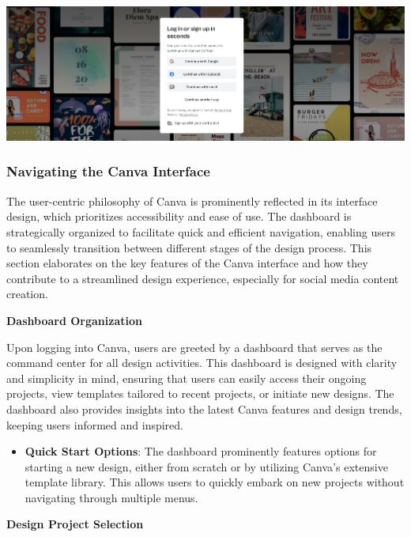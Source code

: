 \documentclass[
]{book}
\providecommand{\tightlist}{%
  \setlength{\itemsep}{0pt}\setlength{\parskip}{0pt}}
\begin{document}
\href{https://www.canva.com/login/}{\includegraphics[width=1\textwidth,height=\textheight]{images/clipboard-1368785933.png}}

\hypertarget{navigating-the-canva-interface}{%
\subsubsection*{Navigating the Canva Interface}\label{navigating-the-canva-interface}}

The user-centric philosophy of Canva is prominently reflected in its interface design, which prioritizes accessibility and ease of use. The dashboard is strategically organized to facilitate quick and efficient navigation, enabling users to seamlessly transition between different stages of the design process. This section elaborates on the key features of the Canva interface and how they contribute to a streamlined design experience, especially for social media content creation.

\textbf{Dashboard Organization}

Upon logging into Canva, users are greeted by a dashboard that serves as the command center for all design activities. This dashboard is designed with clarity and simplicity in mind, ensuring that users can easily access their ongoing projects, view templates tailored to recent projects, or initiate new designs. The dashboard also provides insights into the latest Canva features and design trends, keeping users informed and inspired.

\begin{itemize}
\tightlist
\item
  \textbf{Quick Start Options}: The dashboard prominently features options for starting a new design, either from scratch or by utilizing Canva's extensive template library. This allows users to quickly embark on new projects without navigating through multiple menus.
\end{itemize}

\textbf{Design Project Selection}
\end{document}

